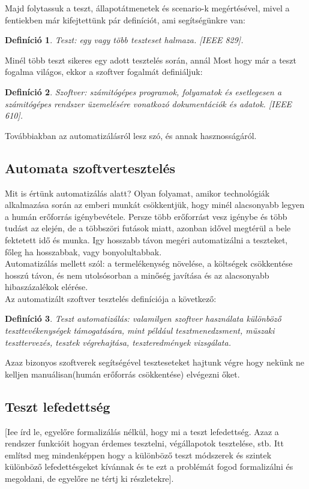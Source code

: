 \documentclass[12pt]{article}
\newtheorem{defin}{Definíció}[section]
\begin{document}
Majd folytassuk a teszt, állapotátmenetek és scenario-k megértésével, mivel a fentiekben már kifejtettünk pár definíciót, ami segítségünkre van:

\begin{defin}
Teszt: egy vagy több teszteset halmaza. [IEEE 829]. ~\cite{htb:masterfield}
\end{defin}

Minél több teszt sikeres egy adott tesztelés során, annál  
Most hogy már a teszt fogalma világos, ekkor a szoftver fogalmát definiáljuk:

\begin{defin}
Szoftver: számitógépes programok, folyamatok és esetlegesen a számitógépes rendszer üzemelésére vonatkozó dokumentációk és adatok. [IEEE 610]. ~\cite{htb:masterfield}
\end{defin}

Továbbiakban az automatizálásról lesz szó, és annak hasznosságáról.

\subsection{Automata szoftvertesztelés}

Mit is értünk automatizálás alatt?
Olyan folyamat, amikor technológiák alkalmazása során az emberi munkát csökkentjük, hogy minél alacsonyabb legyen a humán erőforrás igénybevétele. 
Persze több erőforrást vesz igénybe és több tudást az elején, de a többszöri futások miatt, azonban idővel megtérül a bele fektetett idő és munka. Igy hosszabb távon megéri automatizálni a teszteket, főleg ha hosszabbak, vagy bonyolultabbak.\\
Automatizálás mellett szól: a termelékenység növelése, a költségek csökkentése hosszú távon, és nem utolsósorban a minőség javítása és az alacsonyabb hibaszázalékok elérése.\\
Az automatizált szoftver tesztelés definíciója a következő:

\begin{defin}
Teszt automatizálás: valamilyen szoftver használata különböző teszttevékenységek támogatására, mint például tesztmenedzsment, müszaki teszttervezés, tesztek végrehajtása, teszteredmények vizsgálata. ~\cite{htb:masterfield}
\end{defin}

Azaz bizonyos szoftverek segítségével teszteseteket hajtunk végre hogy nekünk ne kelljen manuálisan(humán erőforrás csökkentése) elvégezni őket. 

\subsection{Teszt lefedettség}
[Iee írd le, egyelőre formalizálás nélkül, hogy mi a teszt lefedettség. Azaz a rendszer funkcióit hogyan érdemes tesztelni, végállapotok tesztelése, stb. Itt említsd meg mindenképpen hogy a különböző teszt módszerek és szintek különböző lefedettésgeket kívánnak és te ezt a problémát fogod formalizálni és megoldani, de egyelőre ne tértj ki részletekre].
\end{document}
